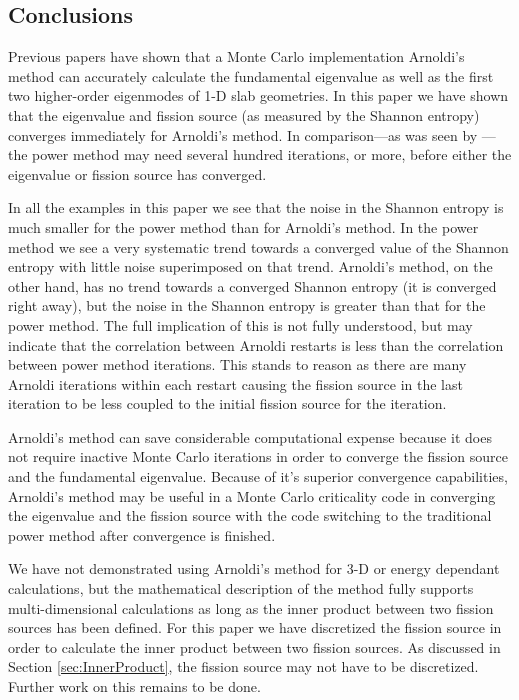 \documentclass[12]{ansnse}
\begin{document}
\begin{doublespace}
\section{Conclusions}\label{sec:Conclusions}
Previous papers\cite{Conlin:2009Secon-0,Conlin:2008Arnol-0,Conlin:2009Relax-0} have shown that a Monte Carlo implementation Arnoldi's method can accurately calculate the fundamental eigenvalue as well as the first two higher-order eigenmodes of 1-D slab geometries.  In this paper we have shown that the eigenvalue and fission source (as measured by the Shannon entropy) converges immediately for Arnoldi's method.  In comparison---as was seen by \citet{Ueki:2005Stati-0}---the power method may need several hundred iterations, or more, before either the eigenvalue or fission source has converged.

In all the examples in this paper we see that the noise in the Shannon entropy is much smaller for the power method than for Arnoldi's method.  In the power method we see a very systematic trend towards a converged value of the Shannon entropy with little noise superimposed on that trend.  Arnoldi's method, on the other hand, has no trend towards a converged Shannon entropy (it is converged right away), but the noise in the Shannon entropy is greater than that for the power method.  The full implication of this is not fully understood, but may indicate that the correlation between Arnoldi restarts is less than the correlation between power method iterations.  This stands to reason as there are many Arnoldi iterations within each restart causing the fission source in the last iteration to be less coupled to the initial fission source for the iteration.

Arnoldi's method can save considerable computational expense because it does not require inactive Monte Carlo iterations in order to converge the fission source and the fundamental eigenvalue.  Because of it's superior convergence capabilities, Arnoldi's method may be useful in a Monte Carlo criticality code in converging the eigenvalue and the fission source with the code switching to the traditional power method after convergence is finished.  

We have not demonstrated using Arnoldi's method for 3-D or energy dependant calculations, but the mathematical description of the method fully supports multi-dimensional calculations as long as the inner product between two fission sources has been defined.  For this paper we have discretized the fission source in order to calculate the inner product between two fission sources.  As discussed in Section \ref{sec:InnerProduct}, the fission source may not have to be discretized.  Further work on this remains to be done.


\end{doublespace}
\end{document}
